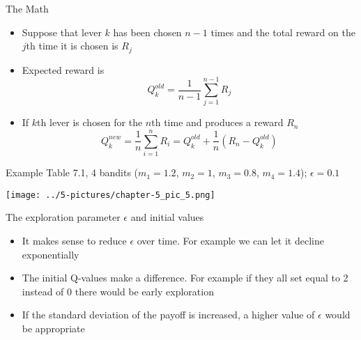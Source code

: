 \documentclass[11pt]{beamer}
\begin{document}
\begin{frame}{The Math}
	\begin{itemize}
		\item Suppose that lever $k$ has been chosen $n-1$ times and the total reward on the $j$th time it is chosen is $R_j$ 
		\item Expected reward is \begin{equation}Q_k^{old}=\frac{1}{n-1}\sum\limits_{j=1}^{n-1}R_j\end{equation} 
		\item If $k$th lever is chosen for the $n$th time and produces a reward $R_n$ \begin{equation}Q_k^{new}=\frac{1}{n}\sum\limits_{i=1}^n R_i = Q_k^{old}+\frac{1}{n}\left(R_n - Q_k^{old} \right) \end{equation}
	\end{itemize}
\end{frame}
\begin{frame}{Example}
	Table 7.1, 4 bandits ($m_1=1.2$, $m_2=1$, $m_3=0.8$, $m_4=1.4$); $\epsilon = 0.1$
	\begin{center}
	\texttt{[image: ../5-pictures/chapter-5\_pic\_5.png]}
	\end{center}
\end{frame}
\begin{frame}{The exploration parameter $\epsilon$ and initial values}
	\begin{itemize}
		\item It makes sense to reduce $\epsilon$ over time. For example we can let it decline exponentially
		\item The initial Q-values make a difference. For example if they all set equal to 2 instead of 0 there would be early exploration
		\item If the standard deviation of the payoff is increased, a higher value of $\epsilon$ would be appropriate 
	\end{itemize}
\end{frame}
\end{document}
